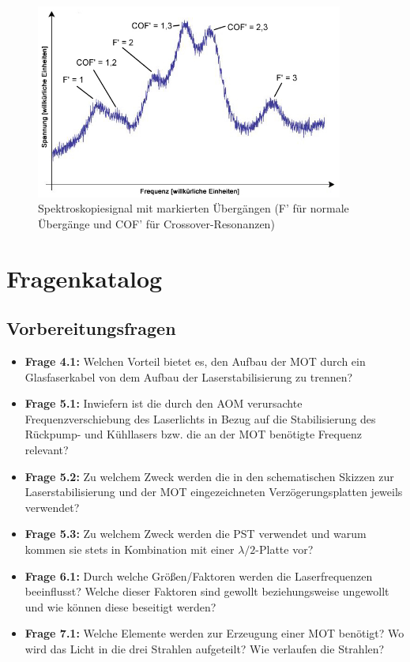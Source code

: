 \documentclass[
class=book,
accentcolor=1b,
custommargins=geometry,
fontsize=11pt,
thesis={type=Versuchsanleitung},
ruledheaders=all,
headline=false,
instbox=false,
marginpar=false,
title=small,
ignore-missing-data=true,
twoside=false,
logofile=apqdesign/tuda_logo.pdf,
pdfa=false %
]{apqpub}
\begin{document}
					\begin{figure}[htb!]
						\centering
						\includegraphics[width = 0.9\textwidth]{graphics/SCO.jpg}
						\caption{Spektroskopiesignal mit markierten Übergängen (F' für normale Übergänge und COF' für Crossover-Resonanzen)}
						\label{fig:COF}
					\end{figure}
					\chapter{Fragenkatalog}\label{sec:FK}			
					\section{Vorbereitungsfragen}
					\begin{itemize}
						\item \textbf{Frage 4.1:} Welchen Vorteil bietet es, den Aufbau der MOT durch ein Glasfaserkabel von dem Aufbau der Laserstabilisierung zu trennen?		
						\item \textbf{Frage 5.1:} Inwiefern ist die durch den AOM verursachte Frequenzverschiebung des Laserlichts in Bezug auf die Stabilisierung des Rückpump- und Kühllasers bzw. die an der MOT benötigte Frequenz relevant?
						\item \textbf{Frage 5.2:} Zu welchem Zweck werden die in den schematischen Skizzen zur Laserstabilisierung und der MOT eingezeichneten Verzögerungsplatten jeweils verwendet?
						\item \textbf{Frage 5.3:} Zu welchem Zweck werden die PST verwendet und warum kommen sie stets in Kombination mit einer $\lambda/2$-Platte vor? 
						\item \textbf{Frage 6.1:} Durch welche Größen/Faktoren werden die Laserfrequenzen beeinflusst? Welche dieser Faktoren sind gewollt beziehungsweise ungewollt und wie können diese beseitigt werden?
						\item \textbf{Frage 7.1:} Welche Elemente werden zur Erzeugung einer MOT benötigt? Wo wird das Licht in die drei Strahlen aufgeteilt? Wie verlaufen die Strahlen?
					\end{itemize}
					
\end{document}
